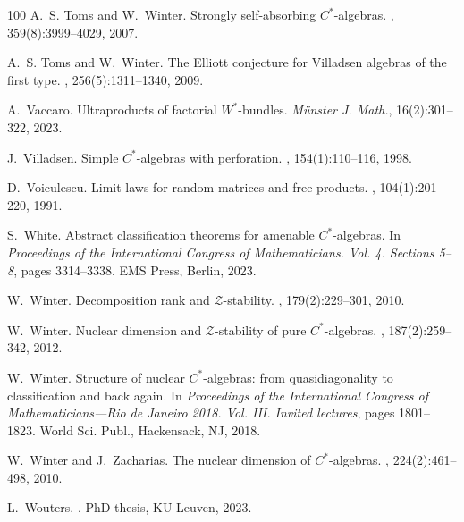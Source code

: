\documentclass[a4paper,11pt]{amsart}
\theoremstyle{definition}
\numberwithin{equation}{section}
\numberwithin{theorem}{section}
\begin{document}
\begin{thebibliography}{100}
A.~S. Toms and W.~Winter.
\newblock Strongly self-absorbing {$C^*$}-algebras.
, 359(8):3999--4029, 2007.

A.~S. Toms and W.~Winter.
\newblock The {E}lliott conjecture for {V}illadsen algebras of the first type.
, 256(5):1311--1340, 2009.

A.~Vaccaro.
\newblock Ultraproducts of factorial {$W^*$}-bundles.
\newblock \emph{M\"unster J. Math.}, 16(2):301--322, 2023.

J.~Villadsen.
\newblock Simple {$C^*$}-algebras with perforation.
, 154(1):110--116, 1998.

D.~Voiculescu.
\newblock Limit laws for random matrices and free products.
, 104(1):201--220, 1991.

S.~White.
\newblock Abstract classification theorems for amenable ${C}^*$-algebras.
\newblock In \emph{Proceedings of the {I}nternational {C}ongress of
  {M}athematicians. {V}ol. 4. {S}ections 5--8}, pages 3314--3338. EMS Press, Berlin, 2023.

W.~Winter.
\newblock Decomposition rank and {$\mathcal{Z}$}-stability.
, 179(2):229--301, 2010.

W.~Winter.
\newblock Nuclear dimension and {$\mathcal{Z}$}-stability of pure
  {$C^*$}-algebras.
, 187(2):259--342, 2012.

W.~Winter.
\newblock Structure of nuclear {$C^*$}-algebras: from quasidiagonality to
  classification and back again.
\newblock In {\em Proceedings of the {I}nternational {C}ongress of
  {M}athematicians---{R}io de {J}aneiro 2018. {V}ol. {III}. {I}nvited
  lectures}, pages 1801--1823. World Sci. Publ., Hackensack, NJ, 2018.

W.~Winter and J.~Zacharias.
\newblock The nuclear dimension of {$C^*$}-algebras.
, 224(2):461--498, 2010.

L.~Wouters.
.
\newblock PhD thesis, KU Leuven, 2023.

\end{thebibliography}
\end{document}
